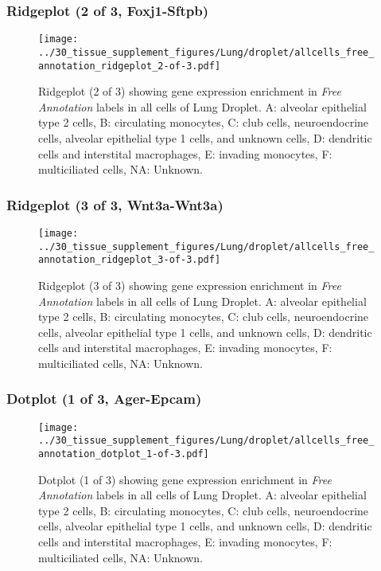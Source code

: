 \clearpage

\subsubsection{Ridgeplot (2 of 3, Foxj1-Sftpb)}
\begin{figure}[h]
\centering
\texttt{[image: ../30\_tissue\_supplement\_figures/Lung/droplet/allcells\_free\_annotation\_ridgeplot\_2-of-3.pdf]}

\caption{ Ridgeplot (2 of 3)  showing gene expression enrichment in \emph{Free Annotation} labels in all cells of Lung Droplet. A: alveolar epithelial type 2 cells, B: circulating monocytes, C: club cells, neuroendocrine cells, alveolar epithelial type 1 cells, and unknown cells, D: dendritic cells and interstital macrophages, E: invading monocytes, F: multiciliated cells, NA: Unknown.}
\end{figure}


\clearpage

\subsubsection{Ridgeplot (3 of 3, Wnt3a-Wnt3a)}
\begin{figure}[h]
\centering
\texttt{[image: ../30\_tissue\_supplement\_figures/Lung/droplet/allcells\_free\_annotation\_ridgeplot\_3-of-3.pdf]}

\caption{ Ridgeplot (3 of 3)  showing gene expression enrichment in \emph{Free Annotation} labels in all cells of Lung Droplet. A: alveolar epithelial type 2 cells, B: circulating monocytes, C: club cells, neuroendocrine cells, alveolar epithelial type 1 cells, and unknown cells, D: dendritic cells and interstital macrophages, E: invading monocytes, F: multiciliated cells, NA: Unknown.}
\end{figure}


\clearpage

\subsubsection{Dotplot (1 of 3, Ager-Epcam)}
\begin{figure}[h]
\centering
\texttt{[image: ../30\_tissue\_supplement\_figures/Lung/droplet/allcells\_free\_annotation\_dotplot\_1-of-3.pdf]}

\caption{ Dotplot (1 of 3)  showing gene expression enrichment in \emph{Free Annotation} labels in all cells of Lung Droplet. A: alveolar epithelial type 2 cells, B: circulating monocytes, C: club cells, neuroendocrine cells, alveolar epithelial type 1 cells, and unknown cells, D: dendritic cells and interstital macrophages, E: invading monocytes, F: multiciliated cells, NA: Unknown.}
\end{figure}


